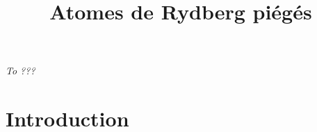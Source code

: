 \documentclass[11pt,a4paper,twoside]{book}
\title{Atomes de Rydberg piégés}
\begin{document}
\newcommand{\numv}[1]{\num[output-decimal-marker={,}]{#1}~}
\newcommand{\SIv}[2]{\SI[output-decimal-marker={,}]{#1}{#2}~}
\newcommand{\SIvv}[2]{\SI[output-decimal-marker={,}]{#1}{#2}}
\newcommand{\Kel}{\si{\kelvin}}
\newcommand{\mK}{\si{\milli\kelvin}}
\newcommand{\uK}{\si{\micro\kelvin}}
\newcommand{\citefr}[1]{\cite{#1}}
\renewcommand{\vec}[1]{\mathbf{#1}}
\newcommand{\dip}{d}
\newcommand{\VdW}{van der Waals }
\newcommand{\umx}{\si{\um^6} }
\newcommand{\Rb}[1]{${}^{#1}$Rb}
\newcommand{\Ryd}{\textnormal{Ryd }}
\newcommand{\pdt}{\partial_t}
\newcommand{\eff}{\textnormal{eff }}
\newcommand{\Id}{\mathbb{I}}
\renewcommand{\thefootnote}{\fnsymbol{footnote}}
\renewcommand \thechapter{\Roman{chapter}}
\newcommand{\kb}{\mathrm{k_B}}


\frontmatter
{}
\thispagestyle{empty}
\vspace*{0.2\textheight}
\begin{center}
\emph{To ???}
\end{center}
\vspace*{\fill}\clearpage
\makeatletter
\let\ps@plain\ps@empty

\makeatother

\tableofcontents
\thispagestyle{fancyplain}
\listoffigures
\listoftables
\thispagestyle{fancyplain}
\mainmatter
{}

\chapter*{Introduction}\label{chapter:intro}




\end{document}
